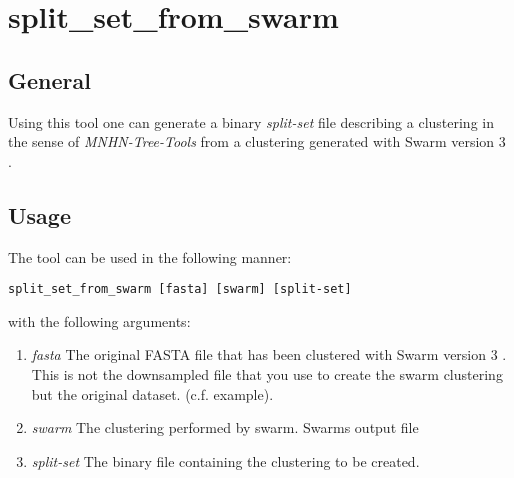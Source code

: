 \section{split\_set\_from\_swarm} \label{sec-ssswarm}

\subsection{General}

Using this tool one can generate a binary \emph{split-set} file describing
a clustering in the sense of \emph{MNHN-Tree-Tools} from a clustering generated
with Swarm version 3 \cite{swarm2}.

\subsection{Usage}
The tool can be used in the following manner:
\begin{lstlisting}
split_set_from_swarm [fasta] [swarm] [split-set]
\end{lstlisting}
with the following arguments:
\begin{enumerate}
  \item \emph{fasta} The original FASTA file that has been clustered with Swarm
    version 3 \cite{swarm2}. This is not the downsampled file that you
    use to create the swarm clustering but the original
    dataset. (c.f. example).
  \item \emph{swarm} The clustering performed by swarm. Swarms output
    file
  \item \emph{split-set} The binary file containing the clustering to
    be created.
\end{enumerate}

